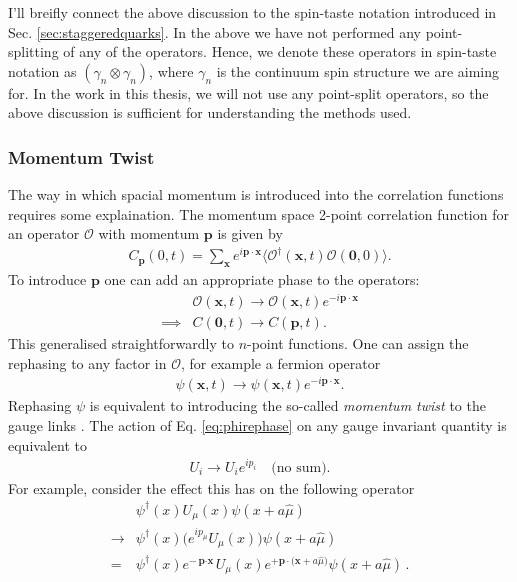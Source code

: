 I'll breifly connect the above discussion to the spin-taste notation introduced in Sec. \ref{sec:staggeredquarks}. In the above we have not performed any point-splitting of any of the operators. Hence, we denote these operators in spin-taste notation as $(\gamma_n\otimes \gamma_n)$, where $\gamma_n$ is the continuum spin structure we are aiming for. In the work in this thesis, we will not use any point-split operators, so the above discussion is sufficient for understanding the methods used.

\subsubsection{Momentum Twist}
\label{sec:momentum_twist}

The way in which spacial momentum is introduced into the correlation functions requires some explaination. The momentum space 2-point correlation function for an operator $\mathcal{O}$ with momentum ${\textbf{p}}$ is given by
\begin{align}
  C_{\textbf{p}}(0,t) = \sum_{{\textbf{x}}} e^{i{\textbf{p}}\cdot{\textbf{x}}} \langle \mathcal{O}^{\dagger} ({\textbf{x}},t) \mathcal{O}({\textbf{0}},0) \rangle.
\end{align}
To introduce ${\textbf{p}}$ one can add an appropriate phase to the operators:
\begin{align}
  \label{eq:phirephase}
  &\mathcal{O}({\textbf{x}},t) \rightarrow \mathcal{O}({\textbf{x}},t)e^{-i{\textbf{p}}\cdot{\textbf{x}}} \\
  \implies &C({\textbf{0}},t) \rightarrow C({\textbf{p}},t).
\end{align}
This generalised straightforwardly to $n$-point functions. One can assign the rephasing to any factor in $\mathcal{O}$, for example a fermion operator
\begin{align}
  \psi({\textbf{x}},t) \rightarrow \psi({\textbf{x}},t)e^{-i{\textbf{p}}\cdot{\textbf{x}}}.
\end{align}
Rephasing $\psi$ is equivalent to introducing the so-called {\it{momentum twist}} to the gauge links \cite{Guadagnoli:2005be}. The action of Eq. \eqref{eq:phirephase} on any gauge invariant quantity is equivalent to
\begin{align}
  U_i \rightarrow U_i e^{ip_i}\quad\text{(no sum)}.
  \label{eq:twist}
\end{align}
For example, consider the effect this has on the following operator
\begin{align}
  \nonumber
  &\psi^{\dagger}(x) U_{\mu}(x) \psi(x+a\hat{\mu}) \\
  \nonumber
  \rightarrow &\psi^{\dagger}(x) \big( e^{ip_{\mu}}U_{\mu}(x) \big) \psi(x+a\hat{\mu})
  \\
  = &\psi^{\dagger}(x)e^{-{\textbf{p}\cdot\textbf{x}}}U_{\mu}(x) e^{+{\textbf{p}\cdot(\textbf{x}}+a\hat{\mu})}\psi(x+a\hat{\mu})\,.
\end{align}
